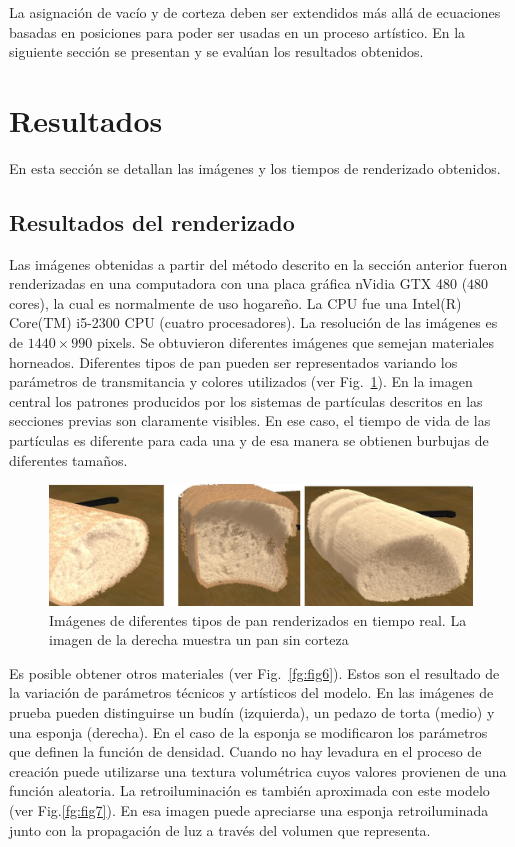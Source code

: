 \documentclass[oneside,a4paper,spanish,links]{amca}
\begin{document}
La asignación de vacío y de corteza deben ser extendidos más
allá de ecuaciones basadas en posiciones para poder ser usadas en un
proceso artístico. En la siguiente sección
se presentan y se evalúan los resultados obtenidos.


\section{Resultados}

En esta sección se detallan las imágenes y los tiempos de
renderizado obtenidos. 

\subsection{Resultados del renderizado}

Las imágenes obtenidas a partir del método descrito en la
sección anterior fueron renderizadas en una computadora con una placa
gráfica nVidia GTX 480 ($480$ cores), la cual es normalmente de uso
hogareño. La CPU fue una Intel(R) Core(TM) i5-2300 CPU (cuatro
procesadores). La resolución de las imágenes es de $1440\times990$
pixels. 
Se obtuvieron diferentes imágenes que semejan materiales
horneados. Diferentes tipos de pan pueden ser representados variando los parámetros de transmitancia y colores utilizados (ver
Fig.~\ref{fg:fig5}). En la imagen central los patrones producidos
por los sistemas de partículas descritos en las secciones previas son
claramente visibles. En ese caso, el tiempo de vida de las partículas
es diferente para cada una y de esa manera se obtienen burbujas de
diferentes tamaños.

\begin{figure}[htb!]
  \centerline{\includegraphics[scale=0.3]{fig5}}
  \caption{Imágenes de diferentes tipos de pan renderizados en tiempo
    real. La imagen de la derecha muestra un pan sin corteza}
  \label{fg:fig5}
\end{figure}

Es posible obtener otros materiales (ver Fig.~\ref{fg:fig6}). Estos son
el resultado de la variación de parámetros técnicos y artísticos del
modelo. En las imágenes de prueba pueden distinguirse un budín (izquierda), un
pedazo de torta (medio) y una esponja (derecha). En el caso de la esponja
se modificaron los parámetros que definen la función de
densidad. Cuando no hay levadura en el proceso de creación puede
utilizarse una textura volumétrica cuyos valores provienen de una
función aleatoria. La retroiluminación es también aproximada con
este modelo (ver Fig.\ref{fg:fig7}). En esa imagen puede apreciarse
una esponja retroiluminada junto con la propagación de luz a
través del volumen que representa.
\end{document}
